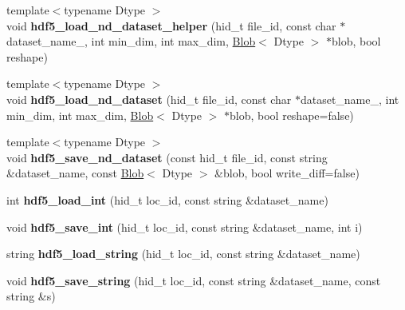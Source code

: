 \begin{DoxyCompactItemize}
\item 
{\footnotesize template$<$typename Dtype $>$ }\\void {\bfseries hdf5\+\_\+load\+\_\+nd\+\_\+dataset\+\_\+helper} (hid\+\_\+t file\+\_\+id, const char $\ast$dataset\+\_\+name\+\_\+, int min\+\_\+dim, int max\+\_\+dim, \hyperlink{classcaffe_1_1Blob}{Blob}$<$ Dtype $>$ $\ast$blob, bool reshape)\hypertarget{namespacecaffe_ab9688e52d4b07eb170658282ab0d5e1b}{}\label{namespacecaffe_ab9688e52d4b07eb170658282ab0d5e1b}

\item 
{\footnotesize template$<$typename Dtype $>$ }\\void {\bfseries hdf5\+\_\+load\+\_\+nd\+\_\+dataset} (hid\+\_\+t file\+\_\+id, const char $\ast$dataset\+\_\+name\+\_\+, int min\+\_\+dim, int max\+\_\+dim, \hyperlink{classcaffe_1_1Blob}{Blob}$<$ Dtype $>$ $\ast$blob, bool reshape=false)\hypertarget{namespacecaffe_acc6c659efb146464737ad573f6662e0b}{}\label{namespacecaffe_acc6c659efb146464737ad573f6662e0b}

\item 
{\footnotesize template$<$typename Dtype $>$ }\\void {\bfseries hdf5\+\_\+save\+\_\+nd\+\_\+dataset} (const hid\+\_\+t file\+\_\+id, const string \&dataset\+\_\+name, const \hyperlink{classcaffe_1_1Blob}{Blob}$<$ Dtype $>$ \&blob, bool write\+\_\+diff=false)\hypertarget{namespacecaffe_a54a9b96a2fd60bdd4df802248d1d241a}{}\label{namespacecaffe_a54a9b96a2fd60bdd4df802248d1d241a}

\item 
int {\bfseries hdf5\+\_\+load\+\_\+int} (hid\+\_\+t loc\+\_\+id, const string \&dataset\+\_\+name)\hypertarget{namespacecaffe_af13193217dcca8c363172e4879032903}{}\label{namespacecaffe_af13193217dcca8c363172e4879032903}

\item 
void {\bfseries hdf5\+\_\+save\+\_\+int} (hid\+\_\+t loc\+\_\+id, const string \&dataset\+\_\+name, int i)\hypertarget{namespacecaffe_a7d7369c88d93cff8a76e3abf0d675ce7}{}\label{namespacecaffe_a7d7369c88d93cff8a76e3abf0d675ce7}

\item 
string {\bfseries hdf5\+\_\+load\+\_\+string} (hid\+\_\+t loc\+\_\+id, const string \&dataset\+\_\+name)\hypertarget{namespacecaffe_a0b914c70a5b96bf41d1fcb7b5966981d}{}\label{namespacecaffe_a0b914c70a5b96bf41d1fcb7b5966981d}

\item 
void {\bfseries hdf5\+\_\+save\+\_\+string} (hid\+\_\+t loc\+\_\+id, const string \&dataset\+\_\+name, const string \&s)\hypertarget{namespacecaffe_adebcd3841c17a53e5272ca12dd56c332}{}\label{namespacecaffe_adebcd3841c17a53e5272ca12dd56c332}


\end{DoxyCompactItemize}
